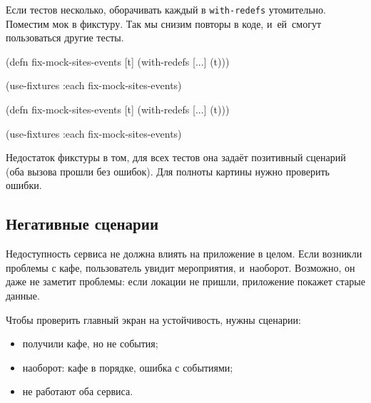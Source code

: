 
Если тестов несколько, оборачивать каждый в \verb|with-redefs|
утомительно. Поместим мок в фикстуру. Так мы снизим повторы в коде, и~ей~смогут
пользоваться другие тесты.

\ifx\devicetype\mobile

\begin{english}
  \begin{clojure}
(defn fix-mock-sites-events [t]
  (with-redefs [...]
    (t)))

(use-fixtures :each
  fix-mock-sites-events)
  \end{clojure}
\end{english}

\else

\begin{english}
  \begin{clojure}
(defn fix-mock-sites-events [t]
  (with-redefs [...]
    (t)))

(use-fixtures :each fix-mock-sites-events)
  \end{clojure}
\end{english}

\fi

Недостаток фикстуры в том, для всех тестов она задаёт позитивный сценарий (оба
вызова прошли без ошибок). Для полноты картины нужно проверить ошибки.

\subsection{Негативные сценарии}


Недоступность сервиса не должна влиять на приложение в целом. Если возникли
проблемы с кафе, пользователь увидит мероприятия, и~наоборот. Возможно, он даже
не заметит проблемы: если локации не пришли, приложение покажет старые данные.

Чтобы проверить главный экран на устойчивость, нужны сценарии:

\begin{itemize}

\item
  получили кафе, но не события;

\item
  наоборот: кафе в порядке, ошибка с событиями;

\item
  не работают оба сервиса.

\end{itemize}

